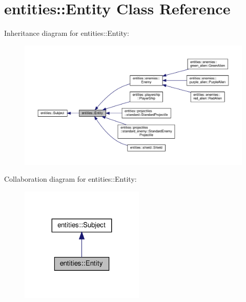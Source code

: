 \hypertarget{classentities_1_1Entity}{}\section{entities\+:\+:Entity Class Reference}
\label{classentities_1_1Entity}


Inheritance diagram for entities\+:\+:Entity\+:\nopagebreak
\begin{figure}[H]
\begin{center}
\leavevmode
\includegraphics[width=350pt]{classentities_1_1Entity__inherit__graph}
\end{center}
\end{figure}


Collaboration diagram for entities\+:\+:Entity\+:\nopagebreak
\begin{figure}[H]
\begin{center}
\leavevmode
\includegraphics[width=167pt]{classentities_1_1Entity__coll__graph}
\end{center}
\end{figure}
